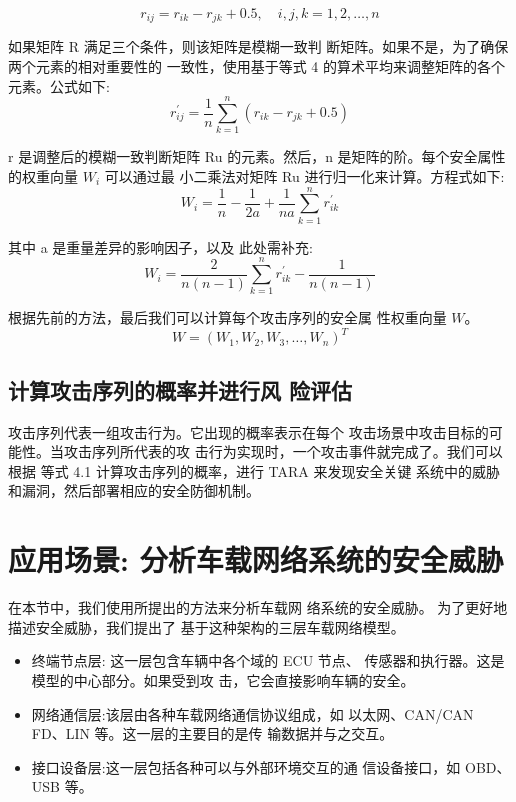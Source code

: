     \begin{equation}
    r_{i j}=r_{i k}-r_{j k}+0.5, \quad i, j, k=1,2, \ldots, n
    \end{equation}
    
如果矩阵 R 满足三个条件，则该矩阵是模糊一致判
断矩阵。如果不是，为了确保两个元素的相对重要性的
一致性，使用基于等式 4 的算术平均来调整矩阵的各个
元素。公式如下:
\begin{equation}
    r_{i j}^{\prime}=\frac{1}{n} \sum_{k=1}^n\left(r_{i k}-r_{j k}+0.5\right)
    \end{equation}

r 是调整后的模糊一致判断矩阵 Ru 的元素。然后，n
是矩阵的阶。每个安全属性的权重向量 $W_i$  可以通过最
小二乘法对矩阵 Ru 进行归一化来计算。方程式如下:
\begin{equation}
    W_i=\frac{1}{n}-\frac{1}{2 a}+\frac{1}{n a} \sum_{k=1}^n r_{i k}^{\prime}
    \end{equation}

    其中 a 是重量差异的影响因子，以及 此处需补充: 
    \begin{equation}
        W_i=\frac{2}{n(n-1)} \sum_{k=1}^n r_{i k}^{\prime}-\frac{1}{n(n-1)}
        \end{equation}
        
        根据先前的方法，最后我们可以计算每个攻击序列的安全属
性权重向量 $W$。
\begin{equation}
    W=\left(W_1, W_2, W_3, \ldots, W_n\right)^T
    \end{equation}

\subsection{计算攻击序列的概率并进行风
险评估}

攻击序列代表一组攻击行为。它出现的概率表示在每个
攻击场景中攻击目标的可能性。当攻击序列所代表的攻
击行为实现时，一个攻击事件就完成了。我们可以根据
等式 4.1 计算攻击序列的概率，进行 TARA 来发现安全关键
系统中的威胁和漏洞，然后部署相应的安全防御机制。
\newline


\section{应用场景: 分析车载网络系统的安全威胁}

在本节中，我们使用所提出的方法来分析车载网
络系统的安全威胁。
为了更好地描述安全威胁，我们提出了
基于这种架构的三层车载网络模型。
\begin{itemize}
    \item 终端节点层: 这一层包含车辆中各个域的 ECU 节点、
    传感器和执行器。这是模型的中心部分。如果受到攻
    击，它会直接影响车辆的安全。
    \item 网络通信层:该层由各种车载网络通信协议组成，如
    以太网、CAN/CAN FD、LIN 等。这一层的主要目的是传
    输数据并与之交互。
    \item 接口设备层:这一层包括各种可以与外部环境交互的通
    信设备接口，如 OBD、USB 等。
\end{itemize}
